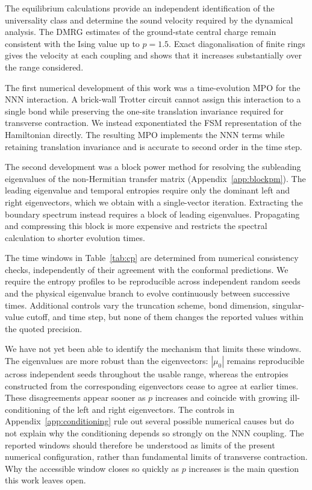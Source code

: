 \documentclass[a4paper,onecolumn,11pt,unpublished]{quantumarticle}
\begin{document}
The equilibrium calculations provide an independent identification of the universality class and determine the sound velocity required by the dynamical analysis. The \ac{DMRG} estimates of the ground-state central charge remain consistent with the Ising value up to $p=1.5$. Exact diagonalisation of finite rings gives the velocity at each coupling and shows that it increases substantially over the range considered.

The first numerical development of this work was a time-evolution \ac{MPO} for the \ac{NNN} interaction. A brick-wall Trotter circuit cannot assign this interaction to a single bond while preserving the one-site translation invariance required for transverse contraction. We instead exponentiated the \ac{FSM} representation of the Hamiltonian directly. The resulting \ac{MPO} implements the \ac{NNN} terms while retaining translation invariance and is accurate to second order in the time step.

The second development was a block power method for resolving the subleading eigenvalues of the non-Hermitian transfer matrix (Appendix~\ref{app:blockpm}). The leading eigenvalue and temporal entropies require only the dominant left and right eigenvectors, which we obtain with a single-vector iteration. Extracting the boundary spectrum instead requires a block of leading eigenvalues. Propagating and compressing this block is more expensive and restricts the spectral calculation to shorter evolution times.

The time windows in Table~\ref{tab:cp} are determined from numerical consistency checks, independently of their agreement with the conformal predictions. We require the entropy profiles to be reproducible across independent random seeds and the physical eigenvalue branch to evolve continuously between successive times. Additional controls vary the truncation scheme, bond dimension, singular-value cutoff, and time step, but none of them changes the reported values within the quoted precision.

We have not yet been able to identify the mechanism that limits these windows. The eigenvalues are more robust than the eigenvectors: $|\mu_0|$ remains reproducible across independent seeds throughout the usable range, whereas the entropies constructed from the corresponding eigenvectors cease to agree at earlier times. These disagreements appear sooner as $p$ increases and coincide with growing ill-conditioning of the left and right eigenvectors. The controls in Appendix~\ref{app:conditioning} rule out several possible numerical causes but do not explain why the conditioning depends so strongly on the \ac{NNN} coupling. The reported windows should therefore be understood as limits of the present numerical configuration, rather than fundamental limits of transverse contraction. Why the accessible window closes so quickly as $p$ increases is the main question this work leaves open.
\end{document}
